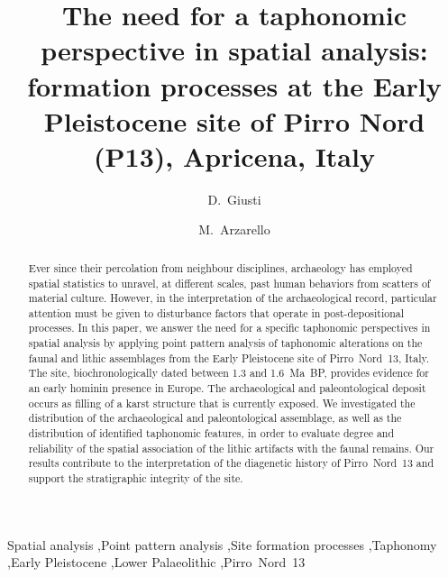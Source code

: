 \documentclass[review,authoryear]{elsarticle} %
\begin{document}
\begin{frontmatter}
  
  \title{The need for a taphonomic perspective in spatial analysis: formation processes at the Early Pleistocene site of Pirro Nord (P13), Apricena, Italy}
  
  \author[tue]{D.~Giusti}
  
  \author[fe]{M.~Arzarello}
  
  \address[tue]{Paläoanthropologie, Senckenberg Center for Human Evolution and Paleoecology, Eberhard Karls Universität Tübingen, Rümelinstr. 23, 72070 Tübingen, Germany}
  \address[fe]{Dipartimento di Studi Umanistici, Università degli Studi di Ferrara, C.so Ercole I d'Este 32, 44100 Ferrara, Italy}

  \begin{abstract}
Ever since their percolation from neighbour disciplines, archaeology has employed spatial statistics to unravel, at different scales, past human behaviors from scatters of material culture. However, in the interpretation of the archaeological record, particular attention must be given to disturbance factors that operate in post-depositional processes. In this paper, we answer the need for a specific taphonomic perspectives in spatial analysis by applying point pattern analysis of taphonomic alterations on the faunal and lithic assemblages from the Early Pleistocene site of Pirro~Nord~13, Italy. The site, biochronologically dated between 1.3 and 1.6~Ma~BP, provides evidence for an early hominin presence in Europe. The archaeological and paleontological deposit occurs as filling of a karst structure that is currently exposed. We investigated the distribution of the archaeological and paleontological assemblage, as well as the distribution of identified taphonomic features, in order to evaluate degree and reliability of the spatial association of the lithic artifacts with the faunal remains. Our results contribute to the interpretation of the diagenetic history of Pirro~Nord~13 and support the stratigraphic integrity of the site.
  \end{abstract}

  \begin{keyword}
    Spatial analysis \sep Point pattern analysis \sep Site formation processes \sep Taphonomy \sep Early Pleistocene \sep Lower Palaeolithic \sep Pirro~Nord~13
  \end{keyword}
  
\end{frontmatter}
\end{document}
